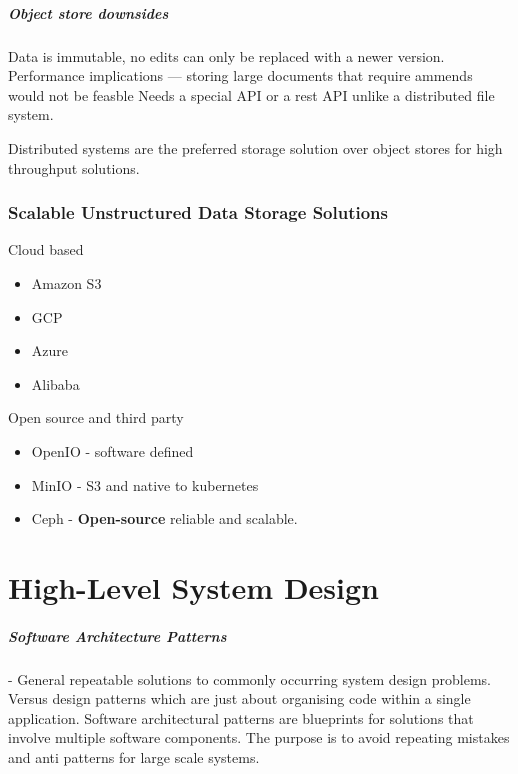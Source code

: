 \documentclass[a4paper, 11pt]{book}
\begin{document}
    \paragraph{Object store downsides}
    Data is immutable, no edits can only be replaced with a newer version.
    Performance implications --- storing large documents that require ammends would not be feasble
    Needs a special API or a rest API unlike a distributed file system.


    Distributed systems are the preferred storage solution over object stores for high throughput solutions.

    \subsection{Scalable Unstructured Data Storage Solutions}
    Cloud based
    \begin{itemize}%
        \item Amazon S3
        \item GCP
        \item Azure
        \item Alibaba
    \end{itemize}

    Open source and third party
    \begin{itemize}
        \item OpenIO - software defined
        \item MinIO - S3 and native to kubernetes
        \item Ceph - \textbf{Open-source} reliable and scalable.
    \end{itemize}


    \chapter{High-Level System Design}

    \paragraph{Software Architecture Patterns} - General repeatable solutions to commonly occurring system design problems.
    Versus design patterns which are just about organising code within a single application.
    Software architectural patterns are blueprints for solutions that involve multiple software components.
    The purpose is to avoid repeating mistakes and anti patterns for large scale systems.
\end{document}
